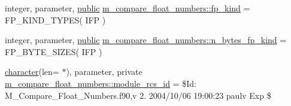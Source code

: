 \begin{DoxyCompactItemize}
\item 
integer, parameter, \hyperlink{M__stopwatch_83_8txt_a2f74811300c361e53b430611a7d1769f}{public} \hyperlink{namespacem__compare__float__numbers_a51e33070a2e2a875e279521aaceaeae4}{m\+\_\+compare\+\_\+float\+\_\+numbers\+::fp\+\_\+kind} = F\+P\+\_\+\+K\+I\+N\+D\+\_\+\+T\+Y\+P\+ES( I\+FP )
\item 
integer, parameter, \hyperlink{M__stopwatch_83_8txt_a2f74811300c361e53b430611a7d1769f}{public} \hyperlink{namespacem__compare__float__numbers_a48468c49657b53321fe55ac0795ba258}{m\+\_\+compare\+\_\+float\+\_\+numbers\+::n\+\_\+bytes\+\_\+fp\+\_\+kind} = F\+P\+\_\+\+B\+Y\+T\+E\+\_\+\+S\+I\+Z\+ES( I\+FP )
\item 
\hyperlink{option__stopwatch_83_8txt_abd4b21fbbd175834027b5224bfe97e66}{character}(len= $\ast$), parameter, private \hyperlink{namespacem__compare__float__numbers_ae0ee7ae6cb351f1a6cf7301460d0d592}{m\+\_\+compare\+\_\+float\+\_\+numbers\+::module\+\_\+rcs\+\_\+id} = \textquotesingle{}\$Id\+: M\+\_\+\+Compare\+\_\+\+Float\+\_\+\+Numbers.\+f90,v 2. 2004/10/06 19\+:00\+:23 paulv Exp \$\textquotesingle{}
\end{DoxyCompactItemize}
